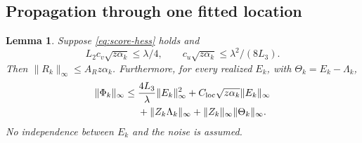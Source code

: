 \documentclass[11pt]{article}
\newcommand{\norm}[1]{\lVert#1\rVert}
\newtheorem{lemma}[theorem]{Lemma}
\theoremstyle{remark}
\begin{document}
\subsection{Propagation through one fitted location}
\begin{lemma}\label{lem:propagation}
Suppose \eqref{eq:score-hess} holds and
\[
 L_2c_v\sqrt{z\alpha_k}\le\lambda/4,\qquad
 c_u\sqrt{z\alpha_k}\le\lambda^2/(8L_3).
\]
Then \(\norm{R_k}_\infty\le A_Rz\alpha_k\). Furthermore, for every
realized \(E_k\), with \(\Theta_k=E_k-\Lambda_k\),
\begin{align}
 \norm{\Phi_k}_\infty
 \le {}&\frac{4L_3}{\lambda}\norm{E_k}_\infty^2
       +C_{\rm loc}\sqrt{z\alpha_k}\norm{E_k}_\infty \notag\\
      &+\norm{Z_k\Lambda_k}_\infty
       +\norm{Z_k}_\infty\norm{\Theta_k}_\infty .
 \label{eq:propagation}
\end{align}
No independence between \(E_k\) and the noise is assumed.
\end{lemma}
\end{document}
